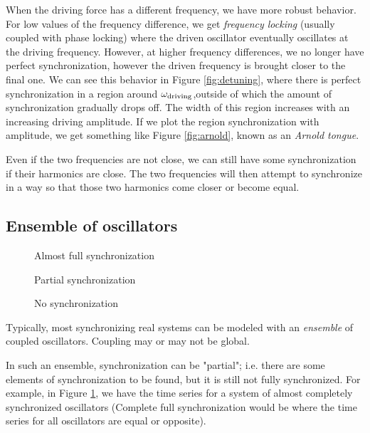 \documentclass[12pt]{article}
\begin{document}
When the driving force has a different frequency, we have more robust behavior. For low values of the frequency difference, we get \emph{frequency locking} (usually coupled with phase locking) where the driven oscillator eventually oscillates at the driving frequency. However, at higher frequency differences, we no longer have perfect synchronization, however the driven frequency is brought closer to the final one. We can see this behavior in Figure \ref{fig:detuning}, where there is perfect synchronization in a region around $\omega_{\rm driving}$,outside of which the amount of synchronization gradually drops off. The width of this region increases with an increasing driving amplitude. If we plot the region synchronization with amplitude, we get something like Figure \ref{fig:arnold}, known as an \emph{Arnold tongue}\cite{pikovsky2001synchronization}.

Even if the two frequencies are not close, we can still have some synchronization if their harmonics are close. The two frequencies will then attempt to synchronize in a way so that those two harmonics come closer or become equal.


\subsection{Ensemble of oscillators}
\begin{figure}
\centering

\caption{Almost full synchronization}\label{fig:fullgraph}
\end{figure}

\begin{figure}
\centering


\caption{Partial synchronization}\label{fig:partialgraph}
\end{figure}

\begin{figure}
\centering


\caption{No synchronization}\label{fig:nograph}
\end{figure}
Typically, most synchronizing real systems can be modeled with an \emph{ensemble} of coupled oscillators. Coupling may or may not be global.

In such an ensemble, synchronization can be "partial"; i.e. there are some elements of synchronization to be found, but it is still not fully synchronized. For example, in Figure \ref{fig:fullgraph}, we have the time series for a system of almost completely synchronized oscillators (Complete full synchronization would be where the time series for all oscillators are equal or opposite).
\end{document}
